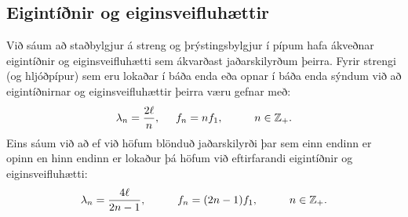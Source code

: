 \subsection*{Eigintíðnir og eiginsveifluhættir}

\begin{tcolorbox}
Við sáum að staðbylgjur á streng og þrýstingsbylgjur í pípum hafa ákveðnar eigintíðnir og eiginsveifluhætti sem ákvarðast jaðarskilyrðum þeirra. Fyrir strengi (og hljóðpípur) sem eru lokaðar í báða enda eða opnar í báða enda sýndum við að eigintíðnirnar og eiginsveifluhættir þeirra væru gefnar með:
\begin{align*}
    \lambda_{n} = \frac{2\ell}{n}, \hspace{0.5cm} f_n = nf_1, \hspace{1cm} n \in \mathbb{Z}_+.
\end{align*}
Eins sáum við að ef við höfum blönduð jaðarskilyrði þar sem einn endinn er opinn en hinn endinn er lokaður þá höfum við eftirfarandi eigintíðnir og eiginsveifluhætti:
\begin{align*}
    \lambda_n = \frac{4\ell}{2n-1}, \hspace{1cm} f_n = (2n-1)f_1, \hspace{1cm} n \in \mathbb{Z}_+.
\end{align*}
\end{tcolorbox}



